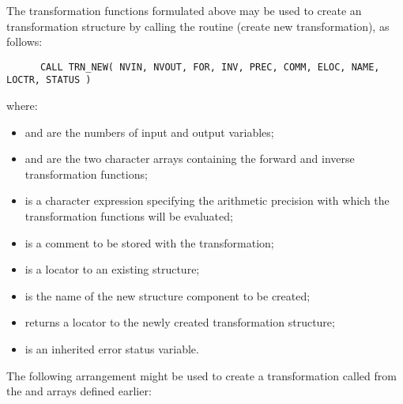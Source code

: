 \label{section:simple:creating}

The transformation functions formulated above may be used to create an
 transformation structure by calling the routine 
(create new transformation), as follows: 

\begin{verbatim}
      CALL TRN_NEW( NVIN, NVOUT, FOR, INV, PREC, COMM, ELOC, NAME, LOCTR, STATUS )
\end{verbatim}

where:

\begin{itemize}

\item {} and  are the numbers of input and output
variables; 

\item {} and  are the two character arrays
containing the forward and inverse transformation functions; 

\item {} is a character expression specifying the arithmetic
precision with which the transformation functions will be evaluated; 

\item {} is a comment to be stored with the transformation; 

\item {} is a locator to an existing  structure; 

\item {} is the  name of the new structure component 
to be created;

\item {} returns a locator to the newly created transformation 
structure;

\item {} is an inherited error status variable.

\end{itemize}

The following arrangement might be used to create a transformation called
 from the  and  arrays defined
earlier: 

